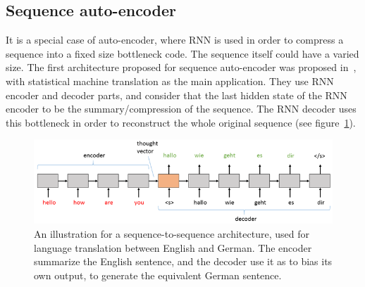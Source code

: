   \subsection{Sequence auto-encoder}
    It is a special case of auto-encoder, where RNN is used in order to compress a sequence into a fixed size bottleneck code. The sequence itself could have a varied size. The first architecture proposed for sequence auto-encoder was proposed in~\citep{cho2014learning,sutskever2014sequence}, with statistical machine translation as the main application. They use RNN encoder and decoder parts, and consider that the last hidden state of the RNN encoder to be the summary/compression of the sequence. The RNN decoder uses this bottleneck in order to reconstruct the whole original sequence (see figure~\ref{fig:seq2seq}).

    \begin{figure}
      \centering
      \includegraphics[scale=0.8]{images/framework/SequencetoS2.png}
      \caption{An illustration for a sequence-to-sequence architecture, used for language translation between English and German. The encoder summarize the English sentence, and the decoder use it as to bias its own output, to generate the equivalent German sentence.}
      \label{fig:seq2seq}
    \end{figure}


